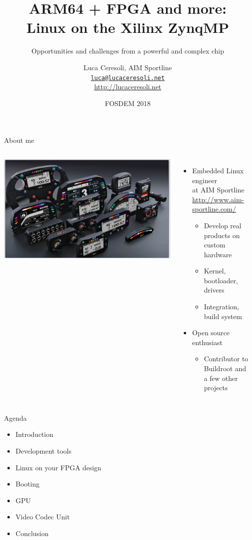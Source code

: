 \documentclass[xetex,table]{beamer}
\title{ARM64 + FPGA and more:\\Linux on the Xilinx ZynqMP}
\subtitle{Opportunities and challenges from a powerful and complex chip}
\author{Luca Ceresoli, AIM Sportline\\
  \href{mailto:luca@lucaceresoli.net}{\tt luca@lucaceresoli.net}\\
  \url{http://lucaceresoli.net}
}
\date{FOSDEM 2018}
\begin{document}
\maketitle

\begin{frame}{About me}
  \begin{columns}
    \includegraphics[width=\textwidth]{../common/images/aim-products.jpg}

    \begin{itemize}
    \item Embedded Linux engineer\\
      at AIM Sportline\\
      {\footnotesize\url{http://www.aim-sportline.com/}}
      \begin{itemize}
      \item Develop real products on custom hardware
      \item Kernel, bootloader, drivers
      \item Integration, build system
      \end{itemize}
    \item Open source enthusiast
      \begin{itemize}
      \item Contributor to Buildroot and a few other projects
      \end{itemize}
    \end{itemize}
  \end{columns}
\end{frame}

\begin{frame}{Agenda}
  \begin{itemize}
  \item Introduction
  \item Development tools
  \item Linux on your FPGA design
  \item Booting
  \item GPU
  \item Video Codec Unit
  \item Conclusion
  \end{itemize}
\end{frame}
\end{document}
